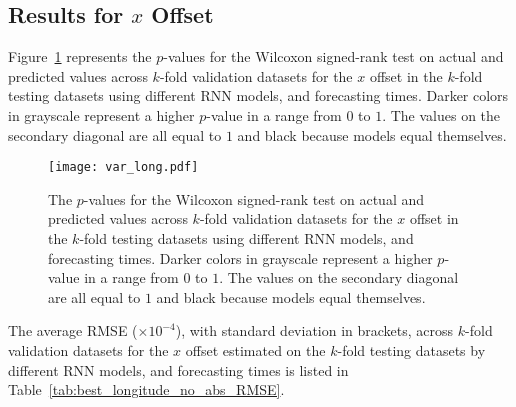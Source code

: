 \subsection{Results for $x$ Offset}

Figure~\ref{fig:var_long} represents the $p$-values for the Wilcoxon signed-rank test on actual and predicted values across $k$-fold validation datasets for the $x$ offset in the $k$-fold testing datasets using different RNN models, and forecasting times. Darker colors in grayscale represent a higher $p$-value in a range from $0$ to $1$. The values on the secondary diagonal are all equal to $1$ and black because models equal themselves.

\begin{figure}[!ht]
	\centering
	\texttt{[image: var\_long.pdf]}
	\caption{The $p$-values for the Wilcoxon signed-rank test on actual and predicted values across $k$-fold validation datasets for the $x$ offset in the $k$-fold testing datasets using different RNN models, and forecasting times. Darker colors in grayscale represent a higher $p$-value in a range from $0$ to $1$. The values on the secondary diagonal are all equal to $1$ and black because models equal themselves.}
	\label{fig:var_long}
\end{figure}

The average RMSE ($\times 10^{-4}$), with standard deviation in brackets, across $k$-fold validation datasets for the $x$ offset estimated on the $k$-fold testing datasets by different RNN models, and forecasting times is listed in Table~\ref{tab:best_longitude_no_abs_RMSE}.

